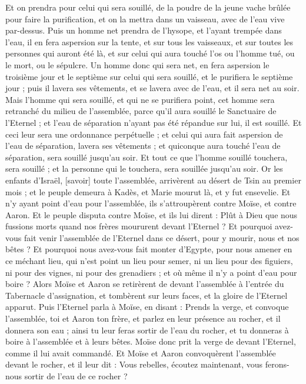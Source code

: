 \begin{multicols}{2}
Et on prendra pour celui qui sera souillé, de la poudre de la jeune vache brûlée pour faire la purification, et on la mettra dans un vaisseau, avec de l'eau vive par-dessus.
Puis un homme net prendra de l'hysope, et l'ayant trempée dans l'eau, il en fera aspersion sur la tente, et sur tous les vaisseaux, et sur toutes les personnes qui auront été là, et sur celui qui aura touché l'os ou l'homme tué, ou le mort, ou le sépulcre.
Un homme donc qui sera net, en fera aspersion le troisième jour et le septième sur celui qui sera souillé, et le purifiera le septième jour ; puis il lavera ses vêtements, et se lavera avec de l'eau, et il sera net au soir.
Mais l'homme qui sera souillé, et qui ne se purifiera point, cet homme sera retranché du milieu de l'assemblée, parce qu'il aura souillé le Sanctuaire de l'Eternel ; et l'eau de séparation n'ayant pas été répandue sur lui, il est souillé.
Et ceci leur sera une ordonnance perpétuelle ; et celui qui aura fait aspersion de l'eau de séparation, lavera ses vêtements ; et quiconque aura touché l'eau de séparation, sera souillé jusqu'au soir.
Et tout ce que l'homme souillé touchera, sera souillé ; et la personne qui le touchera, sera souillée jusqu'au soir.
\VerseOne{}Or les enfants d'Israël, [savoir] toute l'assemblée, arrivèrent au désert de Tsin au premier mois ; et le peuple demeura à Kadès, et Marie mourut là, et y fut ensevelie.
Et n'y ayant point d'eau pour l'assemblée, ils s'attroupèrent contre Moïse, et contre Aaron.
Et le peuple disputa contre Moïse, et ils lui dirent : Plût à Dieu que nous fussions morts quand nos frères moururent devant l'Eternel ?
Et pourquoi avez-vous fait venir l'assemblée de l'Eternel dans ce désert, pour y mourir, nous et nos bêtes ?
Et pourquoi nous avez-vous fait monter d'Egypte, pour nous amener en ce méchant lieu, qui n'est point un lieu pour semer, ni un lieu pour des figuiers, ni pour des vignes, ni pour des grenadiers ; et où même il n'y a point d'eau pour boire ?
Alors Moïse et Aaron se retirèrent de devant l'assemblée à l'entrée du Tabernacle d'assignation, et tombèrent sur leurs faces, et la gloire de l'Eternel apparut.
Puis l'Eternel parla à Moïse, en disant :
Prends la verge, et convoque l'assemblée, toi et Aaron ton frère, et parlez en leur présence au rocher, et il donnera son eau ; ainsi tu leur feras sortir de l'eau du rocher, et tu donneras à boire à l'assemblée et à leurs bêtes.
Moïse donc prit la verge de devant l'Eternel, comme il lui avait commandé.
Et Moïse et Aaron convoquèrent l'assemblée devant le rocher, et il leur dit : Vous rebelles, écoutez maintenant, vous ferons-nous sortir de l'eau de ce rocher ?

\end{multicols}
